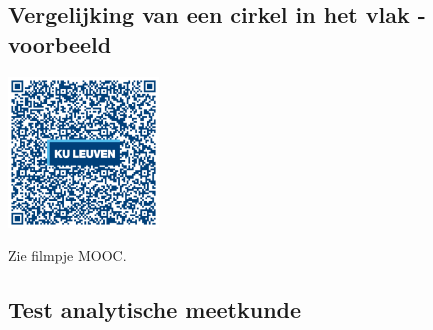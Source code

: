 



\subsection{Vergelijking van een cirkel in het vlak - voorbeeld}
\begin{minipage}{.25\linewidth}
	\raggedright
	\includegraphics[width=4cm]{4_opp_inhoud_an_meetk/inputs/QR_Code_VGLCIRKEL_module4new}
\end{minipage}
\begin{minipage}{.7\linewidth}
	Zie filmpje MOOC.
\end{minipage}

\subsection{Test analytische meetkunde}
